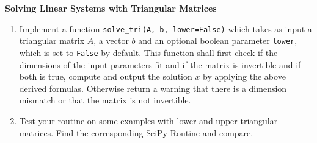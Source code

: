 \textbf{Solving Linear Systems with Triangular Matrices}

\begin{enumerate}
	\item Implement a function \verb|solve_tri(A, b, lower=False)| which takes as input a triangular matrix $A$, a vector $b$ and an optional boolean parameter \verb|lower|, which is set to \verb|False| by default. This function shall first check if the dimensions of the input parameters fit and if the matrix is invertible and if both is true, compute and output the solution $x$ by applying the above derived formulas. Otherwise return a warning that there is a dimension mismatch or that the matrix is not invertible.
	\item Test your routine on some examples with lower and upper triangular matrices. Find the corresponding SciPy Routine and compare.
\end{enumerate}


